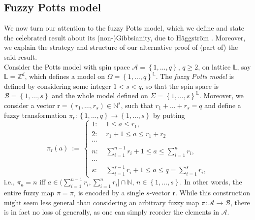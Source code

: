 \documentclass[12pt]{article}
\newcommand{\A}{\mathcal{A}}
\newcommand{\B}{\mathcal{B}}
\renewcommand{\L}{\mathbb{L}}
\newcommand{\N}{\mathbb{N}}
\renewcommand{\r}{\mathrm{r}}
\newcommand{\Z}{\mathbb{Z}}
\newcommand{\set}[1]{\left\{#1\right\}}
\newcommand{\ra}{\rightarrow}
\newcommand{\1}{\mathbbm{1}}
\newcommand{\5}{\vspace{0.5cm}}
\theoremstyle{definition}
\begin{document}

\subsection{Fuzzy Potts model}

We now turn our attention to the fuzzy Potts model, which we define and state the celebrated result about its (non-)Gibbsianity, due to H\"aggstr\"om \cite{Hag}. Moreover, we explain the strategy and structure of our alternative proof of (part of) the said result. \\

Consider the Potts model with spin space $\A=\set{1,\ldots,q}$, $q\geq 2$, on lattice $\L$, say $\L=\Z^d$, which defines a model on $\Omega=\set{1,\ldots,q}^\L$. The \textit{fuzzy Potts model} is defined by considering some integer $1<s<q$, so that the spin space is $\B=\set{1,\ldots,s}$ and the whole model defined on $\Sigma=\set{1,\ldots,s}^\L$. Moreover, we consider a vector $\r=(r_1,\ldots,r_s)\in\N^s$, such that $r_1+\ldots+r_s=q$ and define a fuzzy transformation $\pi_\r:\set{1,\ldots,q}\ra\set{1,\ldots,s}$ by putting 
$$\pi_\r(a) ~:=~ \begin{cases}
1: ~&1\leq a\leq r_1,\\
2: ~&r_1+1\leq a\leq r_1+r_2 \\
\cdots \\
n: ~&\sum_{i=1}^{n-1} r_i + 1\leq a\leq \sum_{i=1}^n r_i,\\
\cdots \\
s: ~&\sum_{i=1}^{s-1}r_i + 1\leq a\leq q=\sum_{i=1}^s r_i,
\end{cases}$$
i.e., $\pi_a=n$ iff $a\in(\sum_{i=1}^{n-1}r_i,\sum_{i=1}^n r_i]\cap \N$, $n\in\set{1,\ldots,s}$. In other words, the entire fuzzy map $\pi=\pi_\r$ is encoded by a single $s$-vector $\r$. While this construction might seem less general than considering an arbitrary fuzzy map $\pi:\A\ra\B$, there is in fact no loss of generally, as one can simply reorder the elements in $\A$. \\
\end{document}
